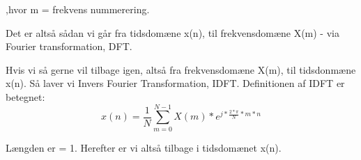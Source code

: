 \documentclass[12pt, letterpaper]{article}
\begin{document}
,hvor m = frekvens nummerering. 



Det er altså sådan vi går fra tidsdomæne x(n), til frekvensdomæne X(m) - via Fourier transformation, DFT. 

Hvis vi så gerne vil tilbage igen, altså fra frekvensdomæne X(m), til tidsdonmæne x(n). Så laver vi Invers Fourier Transformation, IDFT. 
Definitionen af IDFT er betegnet: 
$$x(n)= \frac{1}{N} \sum\limits_{m=0}^{N-1} X(m)*e^{j*\frac{2*\pi}{N}*m*n}$$

Længden er = 1. 
Herefter er vi altså tilbage i tidsdomænet x(n).
\end{document}
